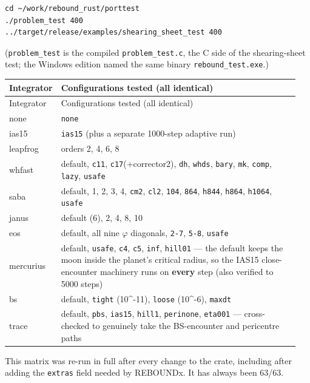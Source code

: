 \documentclass[11pt]{article}
\begin{document}
\begin{lstlisting}
cd ~/work/rebound_rust/porttest
./problem_test 400
../target/release/examples/shearing_sheet_test 400
\end{lstlisting}

(\texttt{problem\_test} is the compiled \texttt{problem\_test.c}, the C side of the shearing-sheet test; the Windows edition named the same binary \texttt{rebound\_test.exe}.)

\begin{longtable}{L{0.094\linewidth}L{0.856\linewidth}}
\toprule
Integrator & Configurations tested (all identical) \\
\midrule
\endfirsthead
\toprule
Integrator & Configurations tested (all identical) \\
\midrule
\endhead
none & \texttt{none} \\
ias15 & \texttt{ias15} (plus a separate 1000-step adaptive run) \\
leapfrog & orders 2, 4, 6, 8 \\
whfast & default, \texttt{c11}, \texttt{c17}(+corrector2), \texttt{dh}, \texttt{whds}, \texttt{bary}, \texttt{mk}, \texttt{comp}, \texttt{lazy}, \texttt{usafe} \\
saba & default, 1, 2, 3, 4, \texttt{cm2}, \texttt{cl2}, \texttt{104}, \texttt{864}, \texttt{h844}, \texttt{h864}, \texttt{h1064}, \texttt{usafe} \\
janus & default (6), 2, 4, 8, 10 \\
eos & default, all nine \(\varphi\) diagonals, \texttt{2-7}, \texttt{5-8}, \texttt{usafe} \\
mercurius & default, \texttt{usafe}, \texttt{c4}, \texttt{c5}, \texttt{inf}, \texttt{hill01} --- the default keeps the moon inside the planet's critical radius, so the IAS15 close-encounter machinery runs on \textbf{every} step (also verified to 5000 steps) \\
bs & default, \texttt{tight} (10\textasciicircum{}-11), \texttt{loose} (10\textasciicircum{}-6), \texttt{maxdt} \\
trace & default, \texttt{pbs}, \texttt{ias15}, \texttt{hill1}, \texttt{perinone}, \texttt{eta001} --- cross-checked to genuinely take the BS-encounter and pericentre paths \\
\bottomrule
\end{longtable}

This matrix was re-run in full after every change to the crate, including after adding the \texttt{extras} field needed by REBOUNDx. It has always been 63/63.
\end{document}
